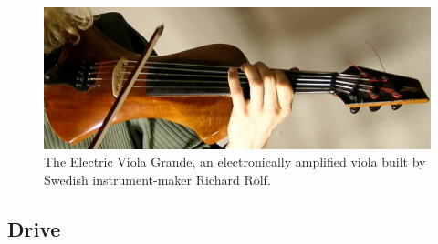 
\newpage

\begin{figure}{}
  \centering
  \includegraphics[width=0.4\linewidth]{img/evg-2}
  \caption{The Electric Viola Grande, an electronically amplified viola built by Swedish instrument-maker Richard Rolf.}
  \label{fig:evg}
\end{figure}

\subsection{Drive}
\label{sec:drive-2003}

